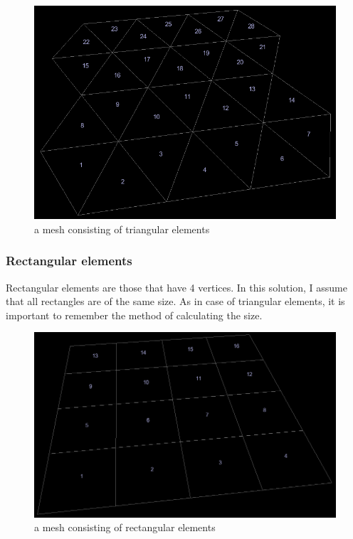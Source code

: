\documentclass[a4paper,12pt]{article}
\begin{document}
\begin{figure}[H]
\begin{center}
  \includegraphics[width=\textwidth]{mesh_triangular}
\end{center}
\caption{a mesh consisting of triangular elements}
\end{figure}

\subsubsection{Rectangular elements}

Rectangular elements are those that have 4 vertices. In this solution, I assume that all rectangles are of the
same size. As in case of triangular elements, it is important to remember the method of calculating the size.

\begin{figure}[H]
\begin{center}
  \includegraphics[width=\textwidth]{mesh_rectangular}
\end{center}
\caption{a mesh consisting of rectangular elements}
\end{figure}
\end{document}
